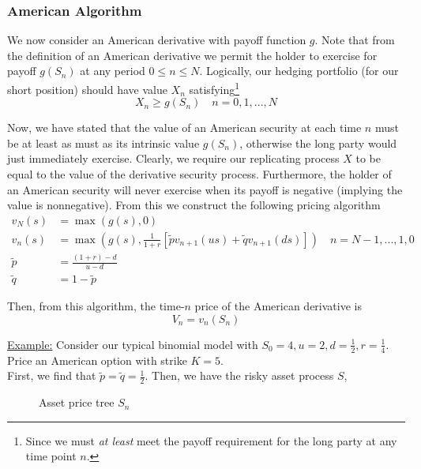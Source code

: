 \documentclass[12pt]{article}
\newlength\tindent
\renewcommand{\indent}{\hspace*{\tindent}}
\begin{document}
\subsubsection{American Algorithm}

\indent We now consider an American derivative with payoff function $g$. Note that from the definition of an American derivative we permit the holder to exercise for payoff $g(S_n)$ at any period $0 \leq n \leq N$. Logically, our hedging portfolio (for our short position) should have value $X_n$ satisfying\footnote{Since we must {\em at least} meet the payoff requirement for the long party at any time point $n$.}
\begin{equation*}
	X_n \geq g(S_n) \quad n = 0,1,...,N
\end{equation*}

\indent Now, we have stated that the value of an American security at each time $n$ must be at least as must as its intrinsic value $g(S_n)$, otherwise the long party would just immediately exercise. Clearly, we require our replicating process $X$ to be equal to the value of the derivative security process. Furthermore, the holder of an American security will never exercise when its payoff is negative (implying the value is nonnegative). From this we construct the following pricing algorithm
\begin{align*}
	v_N(s) &= \max (g(s),0) \\
	v_n(s) &= \max \left(g(s), \frac{1}{1 + r}[\tilde{p}v_{n + 1}(us) + \tilde{q}v_{n + 1}(ds)] \right) \quad n = N - 1,...,1,0 \\
	\tilde{p} &= \frac{(1 + r) - d}{u - d} \\
	\tilde{q} &= 1 - \tilde{p}
\end{align*}

Then, from this algorithm, the time-$n$ price of the American derivative is
\begin{equation*}
	V_n = v_n(S_n)
\end{equation*}

\underline{Example:} Consider our typical binomial model with $S_0 = 4, u = 2, d = \frac{1}{2}, r = \frac{1}{4}$. Price an American option with strike $K = 5$. \\

First, we find that $\tilde{p} = \tilde{q} = \frac{1}{2}$. Then, we have the risky asset process $S$,
\begin{figure}[H]
\centering
{}
\caption{Asset price tree $S_n$}
\end{figure}
\end{document}
